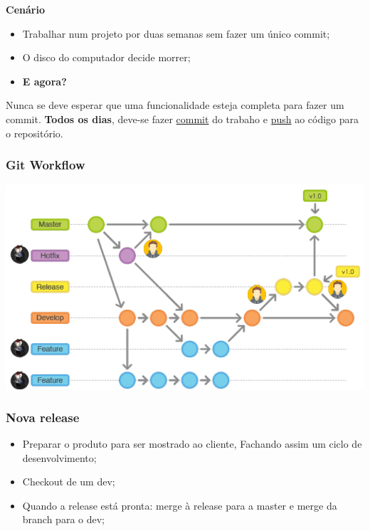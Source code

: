 \documentclass{article}
\begin{document}
\begin{flushleft}
  \textbf{Cenário}
  \begin{itemize}
    \item Trabalhar num projeto por duas semanas sem fazer um único commit;
    \item O disco do computador decide morrer;
    \item \textbf{E agora?}
  \end{itemize}

  Nunca se deve esperar que uma funcionalidade esteja completa
  para fazer um commit. \textbf{Todos os dias}, deve-se fazer
  \uline{commit} do trabaho e \uline{push} ao código para o repositório.
\end{flushleft}

\pagebreak

\subsubsection*{Git Workflow}

\begin{center}
  \includegraphics[scale=0.6]{49}
\end{center}

\subsubsection*{Nova release}

 \begin{itemize}
  \item Preparar o produto para ser mostrado ao cliente, Fachando assim
  um ciclo de desenvolvimento;
  \item Checkout de um dev;
  \item Quando a release está pronta: merge à release para a master e
  merge da branch para o dev;
 \end{itemize}
\end{document}
